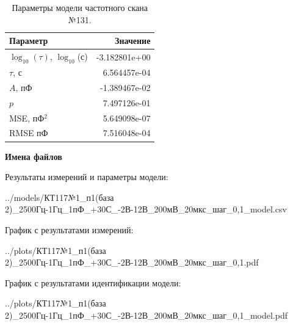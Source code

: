 \begin{table}[!ht]
    \centering
    \caption{Параметры модели частотного скана №131.}
    \begin{tabular}{|l|r|}
        \hline
        Параметр                                       & Значение                  \\ \hline
        $\log_{10}(\tau)$, $\log_{10}$(с)              & -3.182801e+00             \\ \hline
        $\tau$, с                                      & 6.564457e-04              \\ \hline
        $A$, пФ                                        & -1.389467e-02             \\ \hline
        $p$                                            & 7.497126e-01              \\ \hline
        MSE, пФ$^2$                                    & 5.649098e-07              \\ \hline
        RMSE пФ                                        & 7.516048e-04              \\ \hline
    \end{tabular}
    \label{table:frequency_scan_model_131}
\end{table}

\textbf{Имена файлов}

Результаты измерений и параметры модели:

\scriptsize../models/КТ117№1\_п1(база 2)\_2500Гц-1Гц\_1пФ\_+30С\_-2В-12В\_200мВ\_20мкс\_шаг\_0,1\_model.csv
\normalsize

График с результатами измерений:

\scriptsize../plots/КТ117№1\_п1(база 2)\_2500Гц-1Гц\_1пФ\_+30С\_-2В-12В\_200мВ\_20мкс\_шаг\_0,1.pdf
\normalsize

График с результатами идентификации модели:

\scriptsize../plots/КТ117№1\_п1(база 2)\_2500Гц-1Гц\_1пФ\_+30С\_-2В-12В\_200мВ\_20мкс\_шаг\_0,1\_model.pdf
\normalsize

